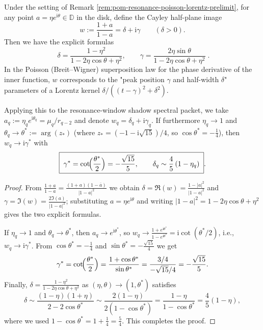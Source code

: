 
\begin{corollary}\label{cor:pom-resonance-cayley-breitwigner-centerwidth}
Under the setting of Remark \ref{rem:pom-resonance-poisson-lorentz-prelimit}, for any point \(a=\eta e^{\mathrm{i}\theta}\in\mathbb{D}\) in the disk, define the Cayley half-plane image
\[
w:=\frac{1+a}{1-a}=\delta+\mathrm{i}\gamma\qquad(\delta>0).
\]
Then we have the explicit formulas
\[
\boxed{\;
\delta=\frac{1-\eta^{2}}{1-2\eta\cos\theta+\eta^{2}},
\qquad
\gamma=\frac{2\eta\sin\theta}{1-2\eta\cos\theta+\eta^{2}}\; }.
\]
In the Poisson (Breit--Wigner) superposition law for the phase derivative of the inner function, \(w\) corresponds to the "peak position \(\gamma\) and half-width \(\delta\)" parameters of a Lorentz kernel
\(
\delta\big/((t-\gamma)^2+\delta^2)
\).
\par
Applying this to the resonance-window shadow spectral packet, we take
\(
a_q:=\eta_q e^{\mathrm{i}\theta_q}=\mu_q/r_{q-2}
\)
and denote \(w_q=\delta_q+\mathrm{i}\gamma_q\).
If furthermore \(\eta_q\to 1\) and \(\theta_q\to \theta^\ast:=\arg(z_\ast)\) (where \(z_\ast=(-1-\mathrm{i}\sqrt{15})/4\), so \(\cos\theta^\ast=-\tfrac14\)), then \(w_q\to \mathrm{i}\gamma^\ast\) with
\[
\boxed{\;
\gamma^\ast=\cot\!\Bigl(\frac{\theta^\ast}{2}\Bigr)=-\frac{\sqrt{15}}{5},
\qquad
\delta_q\sim \frac{4}{5}\,(1-\eta_q)\; }.
\]
\end{corollary}
\begin{proof}
From
\(
\frac{1+a}{1-a}=\frac{(1+a)(1-\overline a)}{|1-a|^2}
\)
we obtain
\(
\delta=\Re(w)=\frac{1-|a|^2}{|1-a|^2}
\)
and
\(
\gamma=\Im(w)=\frac{2\Im(a)}{|1-a|^2}
\);
substituting \(a=\eta e^{\mathrm{i}\theta}\) and writing \(|1-a|^2=1-2\eta\cos\theta+\eta^2\) gives the two explicit formulas.
\par
If \(\eta_q\to 1\) and \(\theta_q\to\theta^\ast\), then \(a_q\to e^{\mathrm{i}\theta^\ast}\), so
\(
w_q\to\frac{1+e^{\mathrm{i}\theta^\ast}}{1-e^{\mathrm{i}\theta^\ast}}
=\mathrm{i}\cot(\theta^\ast/2)
\), i.e., \(w_q\to \mathrm{i}\gamma^\ast\).
From \(\cos\theta^\ast=-\tfrac14\) and \(\sin\theta^\ast=-\tfrac{\sqrt{15}}{4}\) we get
\[
\gamma^\ast=\cot\!\Bigl(\frac{\theta^\ast}{2}\Bigr)=\frac{1+\cos\theta^\ast}{\sin\theta^\ast}
=\frac{3/4}{-\sqrt{15}/4}=-\frac{\sqrt{15}}{5}.
\]
Finally, \(\delta=\frac{1-\eta^2}{1-2\eta\cos\theta+\eta^2}\) as \((\eta,\theta)\to(1,\theta^\ast)\) satisfies
\[
\delta\sim \frac{(1-\eta)(1+\eta)}{2-2\cos\theta^\ast}
\sim \frac{2(1-\eta)}{2(1-\cos\theta^\ast)}
=\frac{1-\eta}{1-\cos\theta^\ast}
=\frac{4}{5}(1-\eta),
\]
where we used \(1-\cos\theta^\ast=1+\tfrac14=\tfrac54\). This completes the proof.
\end{proof}

